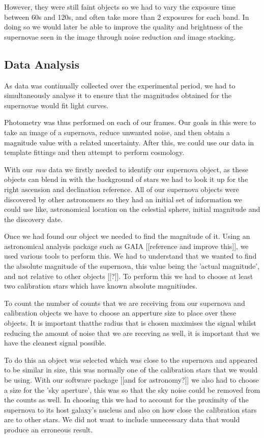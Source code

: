 \documentclass[twocolumn]{revtex4}
\begin{document}
However, they were still faint objects so we had to vary the exposure time between 60s and 120s, and often take more than 2 exposures for each band. In doing so we would later be able to improve the quality and brightness of the supernovae seen in the image through noise reduction and image stacking.

\vspace{-3ex}
\subsection{Data Analysis}
\vspace{-2ex}
As data was continually collected over the experimental period, we had to simultaneously analyse it to ensure that the magnitudes obtained for the supernovae would fit light curves.

Photometry was thus performed on each of our frames. Our goals in this were to take an image of a supernova, reduce unwanted noise, and then obtain a magnitude value with a related uncertainty. After this, we could use our data in template fittings and then attempt to perform cosmology.

With our \textit{raw} data we firstly needed to identify our supernova object, as these objects can blend in with the background of stars we had to look it up for the right ascension and declination reference. All of our supernova objects were discovered by other astronomers so they had an initial set of information we could use like, astronomical location on the celestial sphere, initial magnitude and the discovery date.

Once we had found our object we needed to find the magnitude of it. Using an astronomical analysis package such as GAIA [[reference and improve this]], we used various tools to perform this. We had to understand that we wanted to find the absolute magnitude of the supernova, this value being the 'actual magnitude', and not relative to other objects [[?]]. To perform this we had to choose at least two calibration stars which have known absolute magnitiudes.

To count the number of counts that we are receiving from our supernova and calibration objects we have to choose an apperture size to place over these objects. It is important thatthe radius that is chosen maximises the signal whilst reducing the amount of noise that we are receving as well, it is important that we have the cleanest signal possible.

To do this an object was selected which was close to the supernova and appeared to be similar in size, this was normally one of the calibration stars that we would be using. With our software package [[and for astronomy?]] we also had to choose a size for the 'sky aperture', this was so that the sky noise could be removed from the counts as well. In choosing this we had to account for the proximity of the supernova to its host galaxy's nucleus and also on how close the calibration stars are to other stars. We did not want to include unnecessary data that would produce an erroneous result. 
\end{document}
